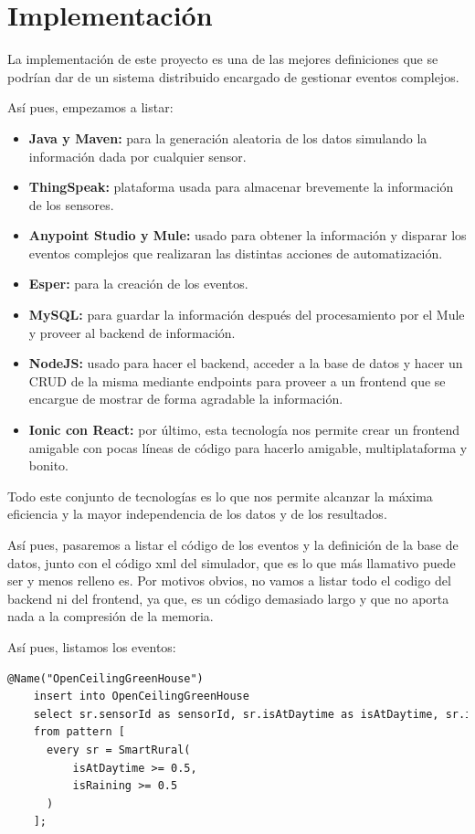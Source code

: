 \documentclass[a4paper,12pt]{article}
\begin{document}
\section{Implementación}
La implementación de este proyecto es una de las mejores definiciones que se podrían dar de un sistema distribuido
encargado de gestionar eventos complejos.

Así pues, empezamos a listar:

\begin{itemize}
  \item \textbf{Java y Maven:} para la generación aleatoria de los datos
        simulando la información dada por cualquier sensor.
  \item \textbf{ThingSpeak:} plataforma usada para almacenar brevemente
        la información de los sensores.
  \item \textbf{Anypoint Studio y Mule:} usado para obtener la información
        y disparar los eventos complejos que realizaran las
        distintas acciones de automatización.
  \item \textbf{Esper:} para la creación de los eventos.
  \item \textbf{MySQL:} para guardar la información después del procesamiento
        por el Mule y proveer al backend de información.
  \item \textbf{NodeJS:} usado para hacer el backend, acceder a la base de datos
        y hacer un CRUD de la misma mediante endpoints
        para proveer a un frontend que se encargue de mostrar de forma agradable la información.
  \item \textbf{Ionic con React:} por último, esta tecnología nos permite crear un frontend
        amigable con pocas líneas de código
        para hacerlo amigable, multiplataforma y bonito.
\end{itemize}

Todo este conjunto de tecnologías es lo que nos permite alcanzar la máxima eficiencia y la mayor
independencia de los datos y de los resultados.

Así pues, pasaremos a listar el código de los eventos y la definición de la base de datos,
junto con el código xml del simulador, que es lo 
que más llamativo puede ser y menos relleno es. Por motivos obvios, no vamos a listar todo el codigo del
backend ni del frontend, ya que, es un código demasiado largo y que no aporta
nada a la compresión de la memoria.

Así pues, listamos los eventos:

\begin{lstlisting}[language=xml,caption=OpenCeilingGreenHouse.epl]
    @Name("OpenCeilingGreenHouse") 
    insert into OpenCeilingGreenHouse
    select sr.sensorId as sensorId, sr.isAtDaytime as isAtDaytime, sr.isRaining as isRaining
    from pattern [
      every sr = SmartRural(
          isAtDaytime >= 0.5,
          isRaining >= 0.5
      )
    ];
\end{lstlisting}
\end{document}

